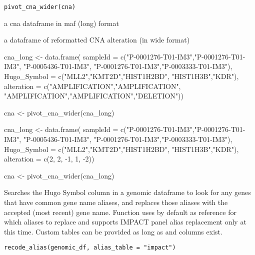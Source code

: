 \documentclass[a4paper]{book}
\begin{document}
%
\begin{Usage}
\begin{verbatim}
pivot_cna_wider(cna)
\end{verbatim}
\end{Usage}
%
\begin{Arguments}
\begin{ldescription}
\item[\code{cna}] a cna dataframe in maf (long) format
\end{ldescription}
\end{Arguments}
%
\begin{Value}
a dataframe of reformatted CNA alteration (in wide format)
\end{Value}
%
\begin{Examples}
\begin{ExampleCode}
cna_long <- data.frame(
    sampleId = c("P-0001276-T01-IM3","P-0001276-T01-IM3",
                 "P-0005436-T01-IM3",
                 "P-0001276-T01-IM3","P-0003333-T01-IM3"),
    Hugo_Symbol = c("MLL2","KMT2D","HIST1H2BD",
                    "HIST1H3B","KDR"),
    alteration = c("AMPLIFICATION","AMPLIFICATION",
                   "AMPLIFICATION","AMPLIFICATION","DELETION"))

cna <- pivot_cna_wider(cna_long)

 cna_long <- data.frame(
    sampleId = c("P-0001276-T01-IM3","P-0001276-T01-IM3",
                 "P-0005436-T01-IM3",
                 "P-0001276-T01-IM3","P-0003333-T01-IM3"),
    Hugo_Symbol = c("MLL2","KMT2D","HIST1H2BD",
                    "HIST1H3B","KDR"),
    alteration = c(2, 2, -1, 1, -2))

cna <- pivot_cna_wider(cna_long)

\end{ExampleCode}
\end{Examples}
%
\begin{Description}\relax
Searches the Hugo Symbol column in a genomic dataframe to look for
any genes that have common gene name aliases,
and replaces those aliases with the accepted (most recent) gene name.
Function uses  by default as reference for
which aliases to replace and supports IMPACT panel alias replacement only at this time.
Custom tables can be provided as long as  and  columns exist.
\end{Description}
%
\begin{Usage}
\begin{verbatim}
recode_alias(genomic_df, alias_table = "impact")
\end{verbatim}
\end{Usage}
\end{document}
